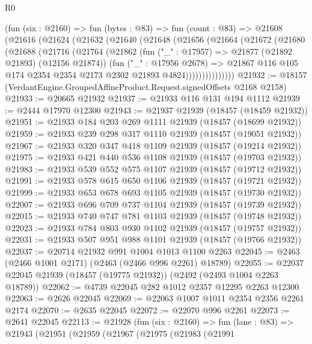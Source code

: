 \begin{lexlean}{R0}
\begin{coremodule}
    (fun (six : @2160) =>
    fun (bytes : @83) =>
    fun (count : @83) =>
    @21608
      (@21616
        (@21624
          (@21632
            (@21640
              (@21648
                (@21656
                  (@21664
                    (@21672
                      (@21680
                        (@21688
                          (@21716
                            (@21764
                              (@21862
                                (fun ("_" : @17957) => @21877 (@21892 @21893) (@12156 @21874))
                                (fun ("_" : @17956 @2678) =>
                                @21867
                                  @116
                                  @105
                                  @174
                                  @2354
                                  @2354
                                  @2173
                                  @2302
                                  @21893
                                  @4824)))))))))))))))
@21932 := @18157 (VerdantEngine.GroupedAffineProduct.Request.signedOffsets @2168 @2158)
@21933 := @20665 @21932
@21937 := @21933 @116 @131 @194 @1112
@21939 := @2444 @17970 @12300
@21943 := @21937 @21939 (@18457 (@18459 @21932))
@21951 := @21933 @184 @203 @269 @1111 @21939 (@18457 (@18699 @21932))
@21959 := @21933 @239 @298 @317 @1110 @21939 (@18457 (@19051 @21932))
@21967 := @21933 @320 @347 @418 @1109 @21939 (@18457 (@19214 @21932))
@21975 := @21933 @421 @440 @536 @1108 @21939 (@18457 (@19703 @21932))
@21983 := @21933 @539 @552 @575 @1107 @21939 (@18457 (@19712 @21932))
@21991 := @21933 @578 @615 @650 @1106 @21939 (@18457 (@19721 @21932))
@21999 := @21933 @653 @678 @693 @1105 @21939 (@18457 (@19730 @21932))
@22007 := @21933 @696 @709 @737 @1104 @21939 (@18457 (@19739 @21932))
@22015 := @21933 @740 @747 @781 @1103 @21939 (@18457 (@19748 @21932))
@22023 := @21933 @784 @803 @930 @1102 @21939 (@18457 (@19757 @21932))
@22031 := @21933 @507 @951 @988 @1101 @21939 (@18457 (@19766 @21932))
@22037 := @20714 @21932 @991 @1004 @1013 @1100 @2263
@22045 := @2463 (@2466 @1001 @2171) (@2463 (@2466 @996 @2261) @18789)
@22055 := @22037 @22045 @21939 (@18457 (@19775 @21932)) (@2492 (@2493 @1004 @2263 @18789))
@22062 := @4739 @22045 @282 @1012 @2357 @12295 @2263 @12300
@22063 := @2626 @22045
@22069 := @22063 @1007 @1011 @2354 @2356 @2261 @2174
@22070 := @2635 @22045
@22072 := @22070 @996 @2261
@22073 := @2641 @22045
@22113 := @21928
    (fun (six : @2160) =>
    fun (lane : @83) =>
    @21943
      (@21951
        (@21959
          (@21967
            (@21975
              (@21983
                (@21991

\end{coremodule}
\end{lexlean}
